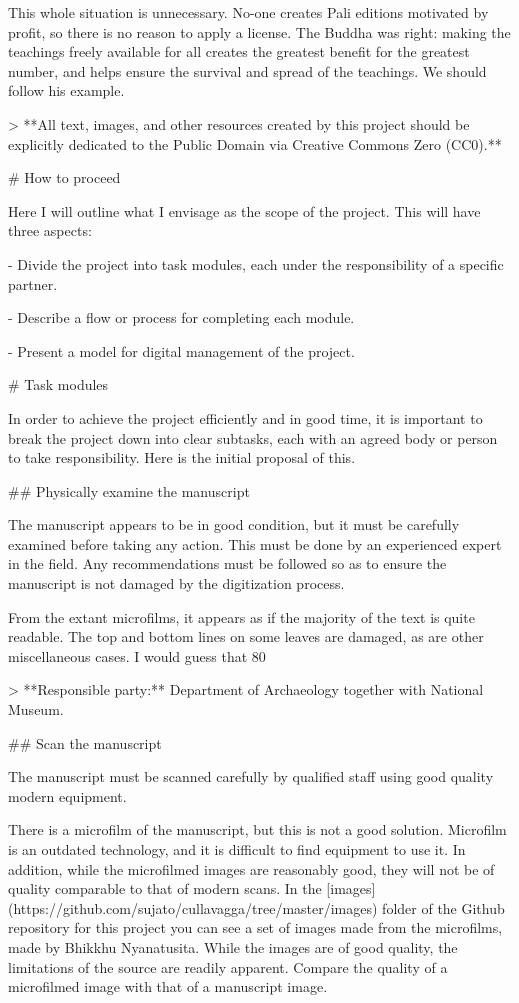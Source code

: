 \documentclass[11pt, openany,a5paper]{article}
\begin{document}
\begin{markdown}
This whole situation is unnecessary. No-one creates Pali editions motivated by profit, so there is no reason to apply a license. The Buddha was right: making the teachings freely available for all creates the greatest benefit for the greatest number, and helps ensure the survival and spread of the teachings. We should follow his example.

> **All text, images, and other resources created by this project should be explicitly dedicated to the Public Domain via Creative Commons Zero (CC0).**

# How to proceed

Here I will outline what I envisage as the scope of the project. This will have three aspects:

- Divide the project into task modules, each under the responsibility of a specific partner.

- Describe a flow or process for completing each module.

- Present a model for digital management of the project.

# Task modules

In order to achieve the project efficiently and in good time, it is important to break the project down into clear subtasks, each with an agreed body or person to take responsibility. Here is the initial proposal of this.

## Physically examine the manuscript

The manuscript appears to be in good condition, but it must be carefully examined before taking any action. This must be done by an experienced expert in the field. Any recommendations must be followed so as to ensure the manuscript is not damaged by the digitization process.

From the extant microfilms, it appears as if the majority of the text is quite readable. The top and bottom lines on some leaves are damaged, as are other miscellaneous cases. I would guess that 80%

   > **Responsible party:** Department of Archaeology together with National Museum.

## Scan the manuscript

The manuscript must be scanned carefully by qualified staff using good quality modern equipment.

There is a microfilm of the manuscript, but this is not a good solution. Microfilm is an outdated technology, and it is difficult to find equipment to use it. In addition, while the microfilmed images are reasonably good, they will not be of quality comparable to that of modern scans. In the [images](https://github.com/sujato/cullavagga/tree/master/images) folder of the Github repository for this project you can see a set of images made from the microfilms, made by Bhikkhu Nyanatusita. While the images are of good quality, the limitations of the source are readily apparent. Compare the quality of a microfilmed image with that of a manuscript image.


\end{markdown}
\end{document}
